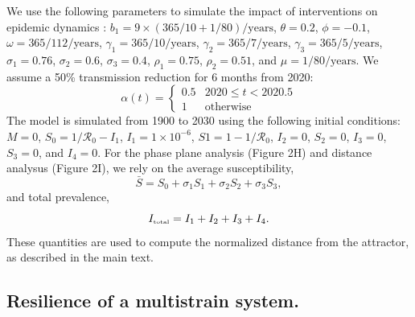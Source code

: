 \documentclass[12pt]{article}
\newcommand{\tsub}[2]{#1_{{\textrm{\tiny #2}}}}
\begin{document}
We use the following parameters to simulate the impact of interventions on epidemic dynamics \citep{pitzer2015environmental}: $b_1 = 9 \times (365/10+1/80)/\mathrm{years}$, $\theta = 0.2$, $\phi = -0.1$, $\omega=365/112/\mathrm{years}$, $\gamma_1=365/10/\mathrm{years}$, $\gamma_2=365/7/\mathrm{years}$, $\gamma_3=365/5/\mathrm{years}$, $\sigma_1 = 0.76$, $\sigma_2 = 0.6$, $\sigma_3 = 0.4$, $\rho_1 = 0.75$, $\rho_2 = 0.51$, and $\mu = 1/80/\mathrm{years}$.
We assume a 50\% transmission reduction for 6 months from 2020:
\begin{equation}
\alpha(t) = \begin{cases}
0.5 & 2020 \leq t< 2020.5\\
1 & \textrm{otherwise}
\end{cases}
\end{equation}
The model is simulated from 1900 to 2030 using the following initial conditions: $M=0$, $S_0=1/\mathcal R_0-I_1$, $I_1=1\times 10^{-6}$, $S1=1-1/\mathcal R_0$, $I_2=0$, $S_2=0$, $I_3=0$, $S_3=0$, and $I_4=0$.
For the phase plane analysis (Figure 2H) and distance analysus (Figure 2I), we rely on the average susceptibility,
\begin{equation}
\bar{S} = S_0 + \sigma_1 S_1 + \sigma_2 S_2 + \sigma_3 S_3,
\end{equation}
and total prevalence,
\begin{equation}
\tsub{I}{total} = I_1 + I_2 + I_3 + I_4.
\end{equation}
These quantities are used to compute the normalized distance from the attractor, as described in the main text.

\subsection*{Resilience of a multistrain system.}
\end{document}
